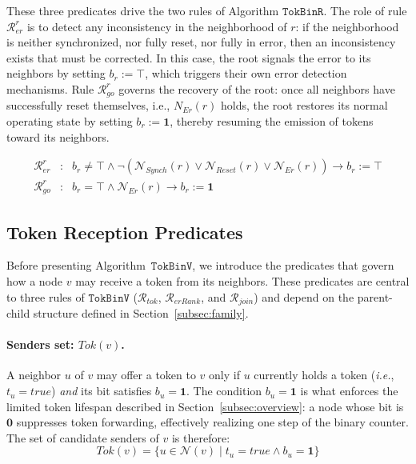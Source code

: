 \documentclass[a4paper, 12pt]{article}
\newcommand{\bz}{\mathbf{0}}
\newcommand{\bo}{\mathbf{1}}
\newcommand{\RerRank}{$\mathscr{R}_{erRank}$}
\newcommand{\Rjoin}{$\mathscr{R}_{join}$}
\newcommand{\Rtok}{$\mathscr{R}_{tok}$}
\newcommand{\RerRoot}{$\mathscr{R}^r_{er}$}
\newcommand{\Rgo}{$\mathscr{R}^r_{go}$}
\begin{document}
These three predicates drive the two rules of Algorithm $\mathtt{TokBinR}$. The role of rule \RerRoot\/ is to detect any inconsistency in the neighborhood of $r$: if the neighborhood is neither synchronized, nor fully reset, nor fully in error, then an inconsistency exists that must be corrected. In this case, the root signals the error to its neighbors by setting $b_r := \top$, which triggers their own error detection mechanisms. Rule \Rgo\/ governs the recovery of the root: once all neighbors have successfully reset themselves, i.e., $N_{Er}(r)$ holds, the root restores its normal operating state by setting $b_r := \bo$, thereby resuming the emission of tokens toward its neighbors.
\begin{algorithm*}[!h]
\[
\begin{array}{lcl}
\mathscr{R}^r_{er} &:& b_r\neq\top \wedge \neg(\mathcal{N}_{Synch}(r)\vee \mathcal{N}_{Reset}(r)\vee \mathcal{N}_{Er}(r))\longrightarrow b_r:=\top\\[4pt]
\mathscr{R}^r_{go} &:& b_r=\top \wedge \mathcal{N}_{Er}(r) \longrightarrow b_r:=\mathbf{1}
\end{array}
\]
\caption{Algorithm $\mathtt{TokBinR}$ for node $r$}
\label{algo:TokBinR}
\end{algorithm*}

\subsection{Token Reception Predicates}
\label{subsec:token-predicates}

Before presenting Algorithm~$\mathtt{TokBinV}$, we introduce the predicates that govern
how a node $v$ may receive a token from its neighbors. These predicates are central to
three rules of $\mathtt{TokBinV}$ (\Rtok, \RerRank, and \/\Rjoin) and depend on the
parent-child structure defined in Section~\ref{subsec:family}.

\paragraph*{Senders set: $\mathit{Tok}(v)$.}
A neighbor $u$ of $v$ may offer a token to $v$ only if $u$ currently holds a token
(\emph{i.e.}, $t_u = \mathit{true}$) \emph{and} its bit satisfies $b_u = \bo$. The condition
$b_u = \bo$ is what enforces the limited token lifespan described in
Section~\ref{subsec:overview}: a node whose bit is $\bz$ suppresses token forwarding,
effectively realizing one step of the binary counter. The set of candidate senders of
$v$ is therefore:
\begin{equation}
    \mathit{Tok}(v) = \bigl\{u \in \mathcal{N}(v) \mid t_u = \mathit{true} \wedge b_u = \bo\bigr\}
    \label{eq:Tok}
\end{equation}
\end{document}
